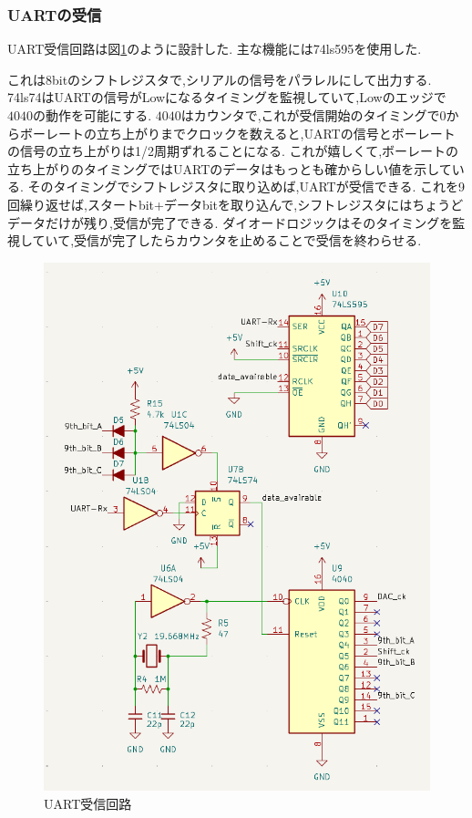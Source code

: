 \documentclass[a4paper,10pt]{article}
\begin{document}
\begin{multicols}{2}[\raggedcolumns]
\subsubsection{UARTの受信}
UART受信回路は図\ref{fig:uart_rx}のように設計した.
主な機能には74ls595を使用した.

これは8bitのシフトレジスタで,シリアルの信号をパラレルにして出力する.
74ls74はUARTの信号がLowになるタイミングを監視していて,Lowのエッジで$4040$の動作を可能にする.
$4040$はカウンタで,これが受信開始のタイミングで0からボーレートの立ち上がりまでクロックを数えると,UARTの信号とボーレートの信号の立ち上がりは1/2周期ずれることになる.
これが嬉しくて,ボーレートの立ち上がりのタイミングではUARTのデータはもっとも確からしい値を示している.
そのタイミングでシフトレジスタに取り込めば,UARTが受信できる.
これを9回繰り返せば,スタートbit+データbitを取り込んで,シフトレジスタにはちょうどデータだけが残り,受信が完了できる.
ダイオードロジックはそのタイミングを監視していて,受信が完了したらカウンタを止めることで受信を終わらせる.

\begin{figure}[H]
    \centering
    \includegraphics[width=\linewidth]{figure/uart_rx.png} 
    \caption{UART受信回路} 
    \label{fig:uart_rx}
\end{figure}


\end{multicols}
\end{document}
